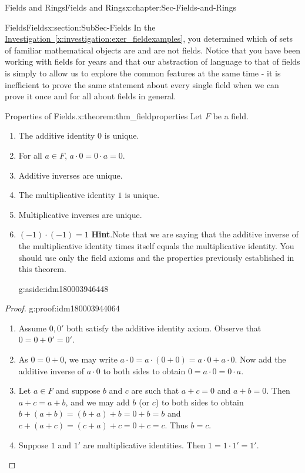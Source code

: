 \documentclass[oneside,10pt,]{book}
\newcommand{\blocktitlefont}{\relax}
\newcommand{\xreffont}{\relax}
\numberwithin{equation}{section}
\begin{document}
\begin{chapterptx}{Fields and Rings}{}{Fields and Rings}{}{}{x:chapter:Sec-Fields-and-Rings}
\begin{sectionptx}{Fields}{}{Fields}{}{}{x:section:SubSec-Fields}
In the \hyperref[x:investigation:exer_fieldexamples]{Investigation~{\xreffont\ref{x:investigation:exer_fieldexamples}}}, you determined which of sets of familiar mathematical objects are and are not fields. Notice that you have been working with fields for years and that our abstraction of language to that of fields is simply to allow us to explore the common features at the same time - it is inefficient to prove the same statement about every single field when we can prove it once and for all about fields in general.%
\begin{theorem}{Properties of Fields.}{}{x:theorem:thm_fieldproperties}%
Let \(F\) be a field.%
\begin{enumerate}
\item{}The additive identity \(0\) is unique.%
\item{}For all \(a\in F\), \(a \cdot 0 = 0\cdot a = 0\).%
\item{}Additive inverses are unique.%
\item{}The multiplicative identity \(1\) is unique.%
\item{}Multiplicative inverses are unique.%
\item{}\((-1)\cdot (-1) = 1\) \textbf{\blocktitlefont Hint}.\quad{}Note that we are saying that the additive inverse of the multiplicative identity times itself equals the multiplicative identity. You should use only the field axioms and the properties previously established in this theorem.%
\begin{aside}{}{g:aside:idm180003946448}%
\end{aside}
%
\end{enumerate}
%
\end{theorem}
\begin{proof}{}{g:proof:idm180003944064}
%
\begin{enumerate}
\item{}Assume \(0, 0'\) both satisfy the additive identity axiom. Observe that \(0 = 0 + 0' = 0'\).%
\item{}As \(0 = 0 + 0\), we may write \(a\cdot 0 = a\cdot (0 + 0) = a\cdot 0 + a \cdot 0\). Now add the additive inverse of \(a\cdot 0\) to both sides to obtain \(0 = a \cdot 0 = 0\cdot a\).%
\item{}Let \(a\in F\) and suppose \(b\) and \(c\) are such that \(a+c = 0\) and \(a+b = 0\). Then \(a+c = a+b\), and we may add \(b\) (or \(c\)) to both sides to obtain \(b+(a+b) = (b+a)+b = 0 + b = b\) and \(c+(a+c) = (c+a)+c = 0 + c = c\). Thus \(b=c\).%
\item{}Suppose \(1\) and \(1'\) are multiplicative identities. Then \(1 = 1 \cdot 1' = 1'\).%

\end{enumerate}
\end{proof}
\end{sectionptx}
\end{chapterptx}
\end{document}
